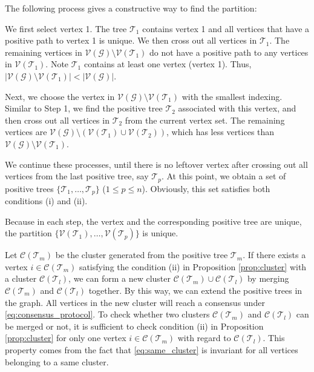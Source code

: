 \documentclass[draftclsnofoot,11pt,onecolumn]{IEEEtran}
\newcommand{\mc}[1]{\mathcal{#1}}
\begin{document}
\begin{IEEEproof}
The following process gives a constructive way to find the partition:

We first select vertex 1. The tree $\mc{T}_1$ contains vertex 1 and all vertices that have a positive path to vertex 1 is unique. We then cross out all vertices in $\mc{T}_1$. The remaining vertices in $\mc{V}(\mc{G})\setminus \mc{V}(\mc{T}_1)$ do not have a positive path to any vertices in $\mc{V}(\mc{T}_1)$. Note $\mc{T}_1$ contains at least one vertex (vertex 1). Thus, $|\mc{V}(\mc{G})\setminus \mc{V}(\mc{T}_1)| < |\mc{V}(\mc{G})|$.

Next, we choose the vertex in $\mc{V}(\mc{G})\setminus \mc{V}(\mc{T}_1)$ with the smallest indexing. Similar to Step 1, we find the positive tree $\mc{T}_2$ associated with this vertex, and then cross out all vertices in $\mc{T}_2$ from the current vertex set. The remaining vertices are $\mc{V}(\mc{G})\setminus (\mc{V}(\mc{T}_1) \cup \mc{V}(\mc{T}_2))$, which has less vertices than  $\mc{V}(\mc{G})\setminus \mc{V}(\mc{T}_1)$.

We continue these processes, until there is no leftover vertex after crossing out all vertices from the last positive tree, say $\mc{T}_p$. At this point, we obtain a set of positive trees $\{\mc{T}_1, \ldots, \mc{T}_p \}$ ($1 \leq p \leq n$). Obviously, this set satisfies both conditions (i) and (ii).

Because in each step, the vertex and the corresponding positive tree are unique, the partition $\{\mc{V}(\mc{T}_1), \ldots, \mc{V}(\mc{T}_p)\}$ is unique.
\end{IEEEproof}

Let $\mc{C}(\mc{T}_m)$ be the cluster generated from the positive tree $\mc{T}_m$. If there exists a vertex $i \in \mc{C}(\mc{T}_m)$ satisfying the condition (ii) in Proposition \ref{prop:cluster} with a cluster $\mc{C}(\mc{T}_l)$, we can form a new cluster $\mc{C}(\mc{T}_m) \cup \mc{C}(\mc{T}_l)$ by merging $\mc{C}(\mc{T}_m)$ and $\mc{C}(\mc{T}_l)$ together. By this way, we can extend the positive trees in the graph. All vertices in the new cluster will reach a consensus under \eqref{eq:consensus_protocol}. To check whether two clusters $\mc{C}(\mc{T}_m)$ and $\mc{C}(\mc{T}_l)$ can be merged or not, it is sufficient to check condition (ii) in Proposition \ref{prop:cluster} for only one vertex $i \in \mc{C}(\mc{T}_m)$ with regard to $\mc{C}(\mc{T}_l)$. This property comes from the fact that \eqref{eq:same_cluster} is invariant for all vertices belonging to a same cluster.
\end{document}
